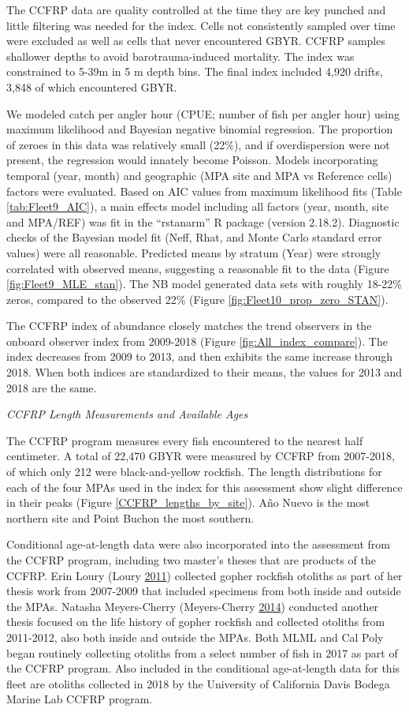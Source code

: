 \documentclass[12pt,]{article}
\begin{document}
The CCFRP data are quality controlled at the time they are key punched
and little filtering was needed for the index. Cells not consistently
sampled over time were excluded as well as cells that never encountered
GBYR. CCFRP samples shallower depths to avoid barotrauma-induced
mortality. The index was constrained to 5-39m in 5 m depth bins. The
final index included 4,920 drifts, 3,848 of which encountered GBYR.

We modeled catch per angler hour (CPUE; number of fish per angler hour)
using maximum likelihood and Bayesian negative binomial regression. The
proportion of zeroes in this data was relatively small (22\%), and if
overdispersion were not present, the regression would innately become
Poisson. Models incorporating temporal (year, month) and geographic (MPA
site and MPA vs Reference cells) factors were evaluated. Based on AIC
values from maximum likelihood fits (Table \ref{tab:Fleet9_AIC}), a main
effects model including all factors (year, month, site and MPA/REF) was
fit in the ``rstanarm'' R package (version 2.18.2). Diagnostic checks of
the Bayesian model fit (Neff, Rhat, and Monte Carlo standard error
values) were all reasonable. Predicted means by stratum (Year) were
strongly correlated with observed means, suggesting a reasonable fit to
the data (Figure \ref{fig:Fleet9_MLE_stan}). The NB model generated data
sets with roughly 18-22\% zeros, compared to the observed 22\% (Figure
\ref{fig:Fleet10_prop_zero_STAN}).

The CCFRP index of abundance closely matches the trend observers in the
onboard observer index from 2009-2018 (Figure
\ref{fig:All_index_compare}). The index decreases from 2009 to 2013, and
then exhibits the same increase through 2018. When both indices are
standardized to their means, the values for 2013 and 2018 are the same.

\emph{CCFRP Length Measurements and Available Ages}

The CCFRP program measures every fish encountered to the nearest half
centimeter. A total of 22,470 GBYR were measured by CCFRP from
2007-2018, of which only 212 were black-and-yellow rockfish. The length
distributions for each of the four MPAs used in the index for this
assessment show slight difference in their peaks (Figure
\ref{CCFRP_lengths_by_site}). Año Nuevo is the most northern site and
Point Buchon the most southern.

Conditional age-at-length data were also incorporated into the
assessment from the CCFRP program, including two master's theses that
are products of the CCFRP. Erin Loury (Loury
\protect\hyperlink{ref-Loury2011}{2011}) collected gopher rockfish
otoliths as part of her thesis work from 2007-2009 that included
specimens from both inside and outside the MPAs. Natasha Meyers-Cherry
(Meyers-Cherry \protect\hyperlink{ref-MeyersCherry2014}{2014}) conducted
another thesis focused on the life history of gopher rockfish and
collected otoliths from 2011-2012, also both inside and outside the
MPAs. Both MLML and Cal Poly began routinely collecting otoliths from a
select number of fish in 2017 as part of the CCFRP program. Also
included in the conditional age-at-length data for this fleet are
otoliths collected in 2018 by the University of California Davis Bodega
Marine Lab CCFRP program.
\end{document}
